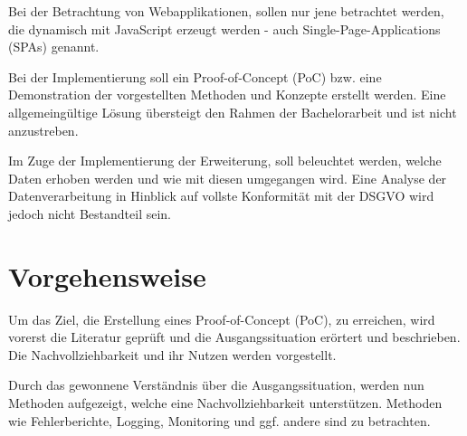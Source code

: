 
Bei der Betrachtung von Webapplikationen, sollen nur jene betrachtet werden, die dynamisch mit JavaScript erzeugt werden - auch Single-Page-Applications (SPAs) genannt.

Bei der Implementierung soll ein Proof-of-Concept (PoC) bzw. eine Demonstration der vorgestellten Methoden und Konzepte erstellt werden. Eine allgemeingültige Lösung übersteigt den Rahmen der Bachelorarbeit und ist nicht anzustreben.


Im Zuge der Implementierung der Erweiterung, soll beleuchtet werden, welche Daten erhoben werden und wie mit diesen umgegangen wird. Eine Analyse der Datenverarbeitung in Hinblick auf vollste Konformität mit der DSGVO wird jedoch nicht Bestandteil sein.

\pagebreak

\section{Vorgehensweise}

Um das Ziel, die Erstellung eines Proof-of-Concept (PoC), zu erreichen, wird vorerst die Literatur geprüft und die Ausgangssituation erörtert und beschrieben. Die Nachvollziehbarkeit und ihr Nutzen werden vorgestellt.


Durch das gewonnene Verständnis über die Ausgangssituation, werden nun Methoden aufgezeigt, welche eine Nachvollziehbarkeit unterstützen. Methoden wie Fehlerberichte, Logging, Monitoring und ggf. andere sind zu betrachten.

